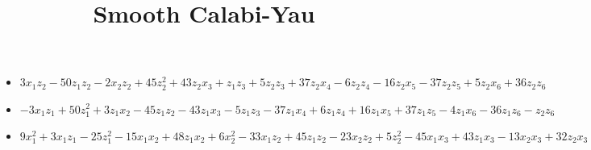 \documentclass[11pt, english]{article}
\begin{document}
\title{Smooth Calabi-Yau}
\date{}
\maketitle

\begin{itemize}
\item $3 {x}_{1} {z}_{2}-50 {z}_{1} {z}_{2}-2 {x}_{2}
       {z}_{2}+45 {z}_{2}^{2}+43 {z}_{2} {x}_{3}+{z}_{1} {z}_{3}+5
       {z}_{2} {z}_{3}+37 {z}_{2} {x}_{4}-6 {z}_{2} {z}_{4}-16 {z}_{2}
       {x}_{5}-37 {z}_{2} {z}_{5}+5 {z}_{2} {x}_{6}+36 {z}_{2} {z}_{6}$

\item $-3
       {x}_{1} {z}_{1}+50 {z}_{1}^{2}+3 {z}_{1} {x}_{2}-45 {z}_{1}
       {z}_{2}-43 {z}_{1} {x}_{3}-5 {z}_{1} {z}_{3}-37 {z}_{1} {x}_{4}+6
       {z}_{1} {z}_{4}+16 {z}_{1} {x}_{5}+37 {z}_{1} {z}_{5}-4 {z}_{1}
       {x}_{6}-36 {z}_{1} {z}_{6}-{z}_{2} {z}_{6}$

\item $9 {x}_{1}^{2}+3 {x}_{1}
       {z}_{1}-25 {z}_{1}^{2}-15 {x}_{1} {x}_{2}+48 {z}_{1} {x}_{2}+6
       {x}_{2}^{2}-33 {x}_{1} {z}_{2}+45 {z}_{1} {z}_{2}-23 {x}_{2}
       {z}_{2}+5 {z}_{2}^{2}-45 {x}_{1} {x}_{3}+43 {z}_{1} {x}_{3}-13
       {x}_{2} {x}_{3}+32 {z}_{2} {x}_{3}+31 {x}_{3}^{2}+30 {x}_{1}
       {z}_{3}+5 {z}_{1} {z}_{3}-25 {x}_{2} {z}_{3}+46 {z}_{2} {z}_{3}+26
       {x}_{3} {z}_{3}+25 {z}_{3}^{2}+20 {x}_{1} {x}_{4}+37 {z}_{1}
       {x}_{4}+17 {x}_{2} {x}_{4}-3 {z}_{2} {x}_{4}-50 {x}_{3} {x}_{4}-34
       {z}_{3} {x}_{4}-45 {x}_{4}^{2}-36 {x}_{1} {z}_{4}-6 {z}_{1}
       {z}_{4}+30 {x}_{2} {z}_{4}-35 {z}_{2} {z}_{4}-11 {x}_{3}
       {z}_{4}+41 {z}_{3} {z}_{4}-40 {x}_{4} {z}_{4}+36 {z}_{4}^{2}+5
       {x}_{1} {x}_{5}-16 {z}_{1} {x}_{5}-21 {x}_{2} {x}_{5}-26 {z}_{2}
       {x}_{5}+38 {x}_{3} {x}_{5}+42 {z}_{3} {x}_{5}+28 {x}_{4}
       {x}_{5}-10 {z}_{4} {x}_{5}-47 {x}_{5}^{2}-20 {x}_{1} {z}_{5}-37
       {z}_{1} {z}_{5}-17 {x}_{2} {z}_{5}+3 {z}_{2} {z}_{5}+50 {x}_{3}
       {z}_{5}+34 {z}_{3} {z}_{5}-11 {x}_{4} {z}_{5}+40 {z}_{4}
       {z}_{5}-28 {x}_{5} {z}_{5}-45 {z}_{5}^{2}+27 {x}_{1} {x}_{6}-46
       {z}_{1} {x}_{6}-23 {x}_{2} {x}_{6}+{z}_{2} {x}_{6}-17 {x}_{3}
       {x}_{6}+45 {z}_{3} {x}_{6}+30 {x}_{4} {x}_{6}+47 {z}_{4}
       {x}_{6}-43 {x}_{5} {x}_{6}-30 {z}_{5} {x}_{6}+20 {x}_{6}^{2}+14
       {x}_{1} {z}_{6}+36 {z}_{1} {z}_{6}+22 {x}_{2} {z}_{6}+8 {z}_{2}
       {z}_{6}-35 {x}_{3} {z}_{6}-45 {z}_{3} {z}_{6}+38 {x}_{4}
       {z}_{6}-28 {z}_{4} {z}_{6}-41 {x}_{5} {z}_{6}-38 {z}_{5}
       {z}_{6}+21 {x}_{6} {z}_{6}-17 {z}_{6}^{2}$


\end{itemize}
\end{document}
